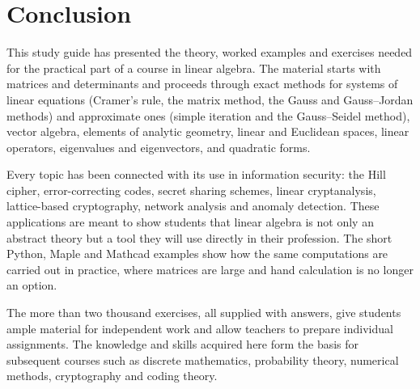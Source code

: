 \chapter*{Conclusion}

This study guide has presented the theory, worked examples and exercises
needed for the practical part of a course in linear algebra. The material
starts with matrices and determinants and proceeds through exact methods
for systems of linear equations (Cramer’s rule, the matrix method, the
Gauss and Gauss–Jordan methods) and approximate ones (simple iteration and
the Gauss–Seidel method), vector algebra, elements of analytic geometry,
linear and Euclidean spaces, linear operators, eigenvalues and
eigenvectors, and quadratic forms.

Every topic has been connected with its use in information security: the
Hill cipher, error-correcting codes, secret sharing schemes, linear
cryptanalysis, lattice-based cryptography, network analysis and anomaly
detection. These applications are meant to show students that linear
algebra is not only an abstract theory but a tool they will use directly in
their profession. The short Python, Maple and Mathcad examples show how the
same computations are carried out in practice, where matrices are large and
hand calculation is no longer an option.

The more than two thousand exercises, all supplied with answers, give
students ample material for independent work and allow teachers to prepare
individual assignments. The knowledge and skills acquired here form the
basis for subsequent courses such as discrete mathematics, probability
theory, numerical methods, cryptography and coding theory.
